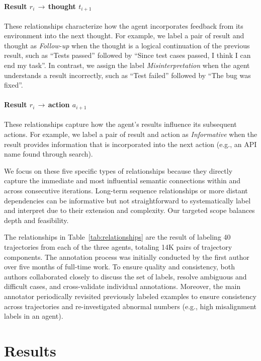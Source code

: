 \documentclass[conference,10pt]{IEEEtran}
\theoremstyle{definition}        %
\begin{document}
\paragraph{Result $r_i$\,$\rightarrow$\,thought $t_{i+1}$}
These relationships characterize how the agent incorporates feedback from its environment into the next thought.
For example, we label a pair of result and thought as \emph{Follow-up} when the thought is a logical continuation of the previous result, such as ``Tests passed'' followed by ``Since test cases passed, I think I can end my task''.
In contrast, we assign the label \emph{Misinterpretation} when the agent understands a result incorrectly, such as ``Test failed'' followed by ``The bug was fixed''.

\paragraph{Result $r_i$\,$\rightarrow$\,action $a_{i+1}$}
These relationships capture how the agent's results influence its subsequent actions.
For example, we label a pair of result and action as \emph{Informative} when the result provides information that is incorporated into the next action (e.g., an API name found through search).


We focus on these five specific types of relationships because they directly capture the immediate and most influential semantic connections within and across consecutive iterations. Long-term sequence relationships or more distant dependencies can be informative but not straightforward to systematically label and interpret due to their extension and complexity. Our targeted scope balances depth and feasibility.

The relationships in Table~\ref{tab:relationships} are the result of labeling 40 trajectories from each of the three agents, totaling 14K pairs of trajectory components.
The annotation process was initially conducted by the first author over five months of full-time work.
To ensure quality and consistency, both authors collaborated closely to discuss the set of labels, resolve ambiguous and difficult cases, and cross-validate individual annotations. Moreover, the main annotator periodically revisited previously labeled examples to ensure consistency across trajectories and re-investigated abnormal numbers (e.g., high misalignment labels in an agent).


\section{Results}
\label{ref:analysis}
	
\end{document}
